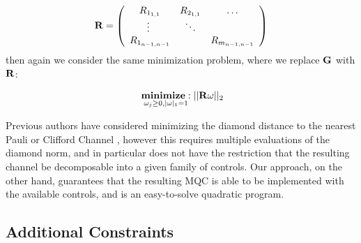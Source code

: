 \documentclass[aps,nofootinbib,pra,notitlepage,twocolumn]{revtex4-1}
\begin{document}
\begin{equation}\label{eq:vectorized_off_diagonal}
	\bold{R} = \left(\begin{array}{cccc}
		R_{1_{1,1}} & R_{2_{1,1}} & \ldots   \\ 
		\vdots\ & \ddots &    \\
		R_{1_{n-1,n-1}} &  &  R_{m_{n-1,n-1}} \\ 
	\end{array} 	
	\right)
\end{equation}
then again we consider the same minimization problem, where we replace $\bold{G}$ with $\bold{R}$:

\begin{equation}\label{eq:minimization_diagonal}
  \begin{split}
    &\underset{\omega_j\geq0, |\omega|_1=1}{\textbf{minimize}: } ||\bold{R}\omega||_2\\
  \end{split}
\end{equation}

Previous authors have considered minimizing the diamond distance to the nearest Pauli or Clifford Channel \cite{Magesan2013}, however this requires multiple evaluations of the diamond norm, and in particular does not have the restriction that the resulting channel be decomposable into a given family of controls. Our approach, on the other hand, guarantees that the resulting MQC is able to be implemented with the available controls, and is an easy-to-solve quadratic program.

\subsection{Additional Constraints}
\end{document}
